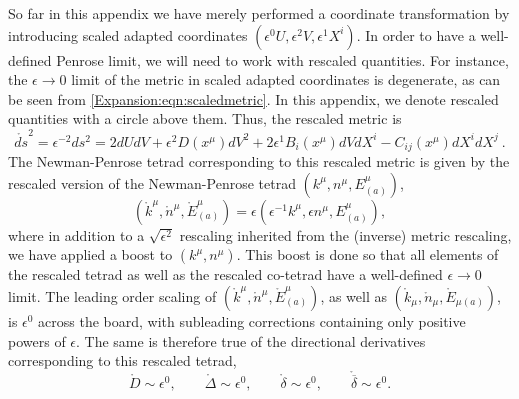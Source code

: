 	So far in this appendix we have merely performed a coordinate transformation by introducing scaled adapted
	coordinates $\left(\epsilon^{0} U, \epsilon^{2} V, \epsilon^{1} X^{i}\right)$. In order to have a well-defined
	Penrose limit, we will need to work with rescaled quantities. For instance, the $\epsilon \to 0$ limit of the
	metric in scaled adapted coordinates is degenerate, as can be seen from \eqref{Expansion:eqn:scaledmetric}. In this
	appendix, we denote rescaled quantities with a circle above them. Thus, the rescaled metric is
	\begin{equation}  
	\mathring{ds}^{2} = \epsilon^{-2} ds^{2} = 2 dU dV + \epsilon^{2} D(x^{\mu}) dV^2 + 2 \epsilon^{1}
	B_i(x^{\mu}) dV dX^i - C_{ij}(x^{\mu})dX^i dX^j \ .
	\end{equation}
	The Newman-Penrose tetrad corresponding to this rescaled metric is given by the rescaled version of the
	Newman-Penrose tetrad $\left(k^{\mu}, n^{\mu}, E^{\mu}_{(a)}\right)$,
	\begin{equation}  
	\left( \mathring{k}^{\mu}, \mathring{n}^{\mu}, \mathring{E}^{\mu}_{(a)}\right) = \epsilon \left(
	\epsilon^{-1} k^{\mu}, \epsilon n^{\mu}, E^{\mu}_{(a)}\right),
	\end{equation}
	where in addition to a $\sqrt{\epsilon^{2}}$ rescaling inherited from the (inverse) metric rescaling, we have applied a boost to $\left(k^{\mu}, n^{\mu}\right)$. This boost is done so that all elements of the rescaled tetrad
	as well as the rescaled co-tetrad have a well-defined $\epsilon \to 0$ limit.
	The leading order scaling of $\left(\mathring{k}^{\mu}, \mathring{n}^{\mu}, \mathring{E}^{\mu}_{(a)}\right)$, as
	well as $\left(\mathring{k}_{\mu}, \mathring{n}_{\mu}, \mathring{E}_{\mu (a)}\right)$, is $\epsilon^{0}$
	across the board, with subleading corrections containing only positive powers of  $\epsilon$. The same is
	therefore true of the directional derivatives corresponding to this rescaled tetrad,
	\begin{equation}  
	\mathring{D} \sim \epsilon^{0}, \qquad \mathring{\Delta} \sim \epsilon^{0}, \qquad \mathring{\delta} \sim
	\epsilon^{0}, \qquad \mathring{\overline{\delta}} \sim \epsilon^{0}.
	\end{equation}
	
